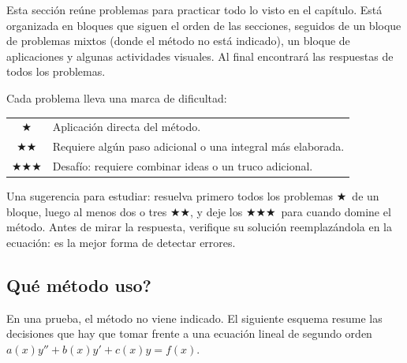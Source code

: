\providecommand{\facil}{\textcolor{bbe}{$\bigstar$}}
\providecommand{\medio}{\textcolor{bbe}{$\bigstar\bigstar$}}
\providecommand{\dificil}{\textcolor{bbe}{$\bigstar\bigstar\bigstar$}}

Esta secci\'on re\'une problemas para practicar todo lo visto en el cap\'itulo. Est\'a organizada en bloques que siguen el orden de las secciones, seguidos de un bloque de problemas mixtos (donde el m\'etodo no est\'a indicado), un bloque de aplicaciones y algunas actividades visuales. Al final encontrar\'a las respuestas de todos los problemas.

Cada problema lleva una marca de dificultad:
\begin{center}
\renewcommand{\arraystretch}{1.4}
\begin{tabular}{cl}
\facil & Aplicaci\'on directa del m\'etodo. \\
\medio & Requiere alg\'un paso adicional o una integral m\'as elaborada. \\
\dificil & Desaf\'io: requiere combinar ideas o un truco adicional. \\
\end{tabular}
\end{center}

Una sugerencia para estudiar: resuelva primero todos los problemas \facil\ de un bloque, luego al menos dos o tres \medio, y deje los \dificil\ para cuando domine el m\'etodo. Antes de mirar la respuesta, verifique su soluci\'on reemplaz\'andola en la ecuaci\'on: es la mejor forma de detectar errores.

\subsection*{\textquestiondown Qu\'e m\'etodo uso?}

En una prueba, el m\'etodo no viene indicado. El siguiente esquema resume las decisiones que hay que tomar frente a una ecuaci\'on lineal de segundo orden $a(x)y''+b(x)y'+c(x)y=f(x)$.

